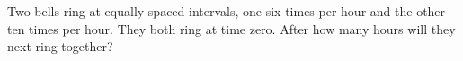 Two bells ring at equally spaced intervals, one six times per hour and the other ten times per hour. They both ring at time zero. After how many hours will they next ring together?
